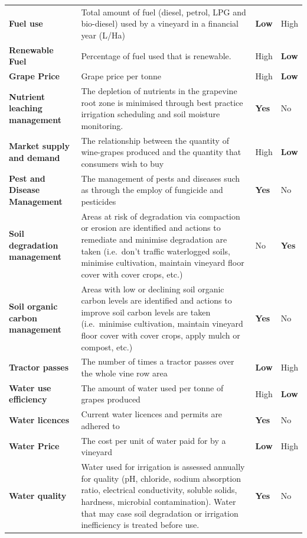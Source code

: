 \documentclass[fleqn,10pt]{wlscirep}
\begin{document}
\begin{table}[h]
\begin{tabular}{@{}llll@{}}
    \textbf{Fuel use} & Total amount of fuel (diesel, petrol, LPG and bio-diesel) used by a vineyard in a financial year (L/Ha) & \textbf{Low} & High \\
    \textbf{Renewable Fuel} & Percentage of fuel used that is renewable. & High & \textbf{Low} \\
    \textbf{Grape Price} & Grape price per tonne & High & \textbf{Low} \\
    \textbf{Nutrient leaching management} & The depletion of nutrients in the grapevine root zone is minimised through best practice irrigation scheduling and soil moisture monitoring. & \textbf{Yes} & No \\
    \textbf{Market supply and demand} & The relationship between the quantity of wine-grapes produced and the quantity that consumers wish to buy & High & \textbf{Low} \\
    \textbf{Pest and Disease Management} & The management of pests and diseases such as through the employ of fungicide and pesticides & \textbf{Yes} & No \\
    \textbf{Soil degradation management} & Areas at risk of degradation via compaction or erosion are identified and actions to remediate and minimise degradation are taken (i.e.~don't traffic waterlogged soils, minimise cultivation, maintain vineyard floor cover with cover crops, etc.) & No & \textbf{Yes} \\
    \textbf{Soil organic carbon management} & Areas with low or declining soil organic carbon levels are identified and actions to improve soil carbon levels are taken (i.e.~minimise cultivation, maintain vineyard floor cover with cover crops, apply mulch or compost, etc.) & \textbf{Yes} & No \\
    \textbf{Tractor passes} & The number of times a tractor passes over the whole vine row area & \textbf{Low} & High \\
    \textbf{Water use efficiency} & The amount of water used per tonne of grapes produced & High & \textbf{Low} \\
    \textbf{Water licences} & Current water licences and permits are adhered to & \textbf{Yes} & No \\
    \textbf{Water Price} & The cost per unit of water paid for by a vineyard & \textbf{Low} & High \\
    \textbf{Water quality} & Water used for irrigation is assessed annually for quality (pH, chloride, sodium absorption ratio, electrical conductivity, soluble solids, hardness, microbial contamination). Water that may case soil degradation or irrigation inefficiency is treated before use. & \textbf{Yes} & No \\

\end{tabular}
\end{table}
\end{document}
